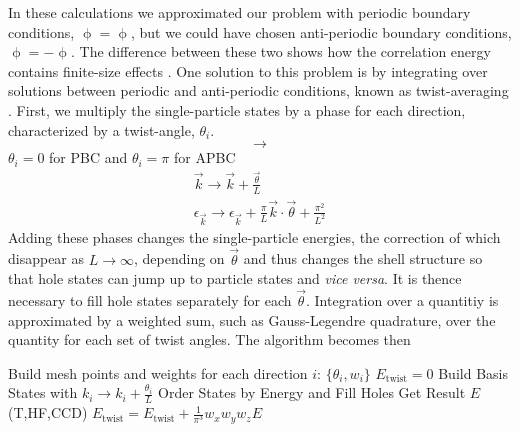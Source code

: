 In these calculations we
approximated our problem with periodic boundary conditions,
  $\mathop{\phi(x_{i})}=\mathop{\phi(x_{i}+L)}$, but we could have
  chosen anti-periodic boundary conditions,
  $\mathop{\phi(x_{i})}=-\mathop{\phi(x_{i}+L)}$. The difference
  between these two shows how the correlation energy contains
  finite-size effects \cite{gros1992,gros1996,shepherd2012,shepherd2016}. One solution to this problem is by integrating
  over solutions between periodic and anti-periodic conditions, known
  as twist-averaging \cite{twistaverage}. First, we multiply the single-particle states by
  a phase for each direction, characterized by a twist-angle,
  $\theta_{i}$.
  \begin{equation}
    \mathop{\phi_{\vec{k}}(\vec{x}+\vec{L})}\rightarrow\mathop{e^{i\vec{\theta}}\phi_{\vec{k}}(\vec{x})}
  \end{equation}
  $\theta_{i}=0$ for PBC and $\theta_{i}=\pi$ for APBC
  \begin{align}
  \vec{k}\rightarrow\vec{k}+\frac{\vec{\theta}}{L}
  \\ \epsilon_{\vec{k}}\rightarrow\epsilon_{\vec{k}}+\frac{\pi}{L}\vec{k}\cdot\vec{\theta}+\frac{\pi^{2}}{L^{2}}
  \end{align}
  Adding these phases changes the single-particle energies, the
  correction of which disappear as $L\rightarrow\infty$, depending on
  $\vec{\theta}$ and thus changes the shell structure so that hole
  states can jump up to particle states and {\em vice versa}. It is thence
  necessary to fill hole states separately for each
  $\vec{\theta}$. Integration over a quantitiy is approximated by a
  weighted sum, such as Gauss-Legendre quadrature, over the quantity
  for each set of twist angles. The algorithm becomes then
\begin{svgraybox}
  \begin{algorithmic}
    \State Build mesh points and weights for each direction $i$:
    $\{\theta_{i},w_{i}\}$ \State $E_{\text{twist}}=0$
    \State Build Basis States with $k_{i}\rightarrow
    k_{i}+\frac{\theta_{i}}{L}$ \State Order States by Energy and Fill
    Holes \State Get Result $E$ (T,HF,CCD) \State
    $E_{\text{twist}}=E_{\text{twist}}+\frac{1}{\pi^{3}}w_{x}w_{y}w_{z}E$
    \EndFor \EndFor \EndFor
  \end{algorithmic}
\end{svgraybox}
